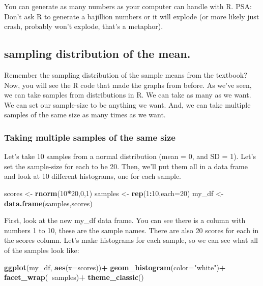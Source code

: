 \documentclass[]{book}
\newenvironment{Shaded}{\begin{snugshade}}{\end{snugshade}}
\newcommand{\KeywordTok}[1]{\textcolor[rgb]{0.13,0.29,0.53}{\textbf{#1}}}
\newcommand{\DataTypeTok}[1]{\textcolor[rgb]{0.13,0.29,0.53}{#1}}
\newcommand{\DecValTok}[1]{\textcolor[rgb]{0.00,0.00,0.81}{#1}}
\newcommand{\StringTok}[1]{\textcolor[rgb]{0.31,0.60,0.02}{#1}}
\newcommand{\OperatorTok}[1]{\textcolor[rgb]{0.81,0.36,0.00}{\textbf{#1}}}
\newcommand{\NormalTok}[1]{#1}
\begin{document}
You can generate as many numbers as your computer can handle with R.
PSA: Don't ask R to generate a bajillion numbers or it will explode (or
more likely just crash, probably won't explode, that's a metaphor).

\subsection{sampling distribution of the
mean.}\label{sampling-distribution-of-the-mean.}

Remember the sampling distribution of the sample means from the
textbook? Now, you will see the R code that made the graphs from before.
As we've seen, we can take samples from distributions in R. We can take
as many as we want. We can set our sample-size to be anything we want.
And, we can take multiple samples of the same size as many times as we
want.

\subsubsection{Taking multiple samples of the same
size}\label{taking-multiple-samples-of-the-same-size}

Let's take 10 samples from a normal distribution (mean = 0, and SD = 1).
Let's set the sample-size for each to be 20. Then, we'll put them all in
a data frame and look at 10 different histograms, one for each sample.

\begin{Shaded}
\begin{Highlighting}[]
\NormalTok{scores <-}\StringTok{ }\KeywordTok{rnorm}\NormalTok{(}\DecValTok{10}\OperatorTok{*}\DecValTok{20}\NormalTok{,}\DecValTok{0}\NormalTok{,}\DecValTok{1}\NormalTok{)}
\NormalTok{samples <-}\StringTok{ }\KeywordTok{rep}\NormalTok{(}\DecValTok{1}\OperatorTok{:}\DecValTok{10}\NormalTok{,}\DataTypeTok{each=}\DecValTok{20}\NormalTok{)}
\NormalTok{my_df <-}\StringTok{ }\KeywordTok{data.frame}\NormalTok{(samples,scores)}
\end{Highlighting}
\end{Shaded}

First, look at the new my\_df data frame. You can see there is a column
with numbers 1 to 10, these are the sample names. There are also 20
scores for each in the scores column. Let's make histograms for each
sample, so we can see what all of the samples look like:

\begin{Shaded}
\begin{Highlighting}[]
\KeywordTok{ggplot}\NormalTok{(my_df, }\KeywordTok{aes}\NormalTok{(}\DataTypeTok{x=}\NormalTok{scores))}\OperatorTok{+}
\StringTok{  }\KeywordTok{geom_histogram}\NormalTok{(}\DataTypeTok{color=}\StringTok{"white"}\NormalTok{)}\OperatorTok{+}
\StringTok{  }\KeywordTok{facet_wrap}\NormalTok{(}\OperatorTok{~}\NormalTok{samples)}\OperatorTok{+}
\StringTok{  }\KeywordTok{theme_classic}\NormalTok{()}
\end{Highlighting}
\end{Shaded}
\end{document}
